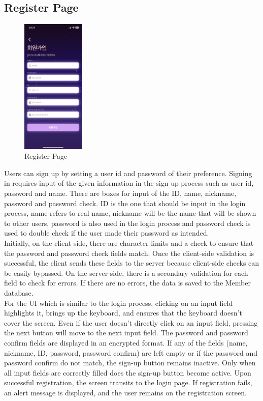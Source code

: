 \documentclass[conference]{IEEEtran}
\begin{document}
    \subsection{Register Page}
        \begin{figure}[htbp]
            \centerline{\includegraphics[width=3cm]{Images/screen/signup/SIGNUP_EMPTY.PNG}}
            \caption{Register Page}
            \label{fig}
        \end{figure}
        Users can sign up by setting a user id and password of their preference. Signing in requires input  of the given information in the sign up process such as user id, password and name. There are boxes for input of the ID, name, nickname, password and password check. ID is the one that should be input in the login process, name refers to real name, nickname will be the name that will be shown to other users, password is also used in the login process and password check is used to double check if the user made their password as intended.\\
        Initially, on the client side, there are character limits and a check to ensure that the password and password check fields match. Once the client-side validation is successful, the client sends these fields to the server because client-side checks can be easily bypassed. On the server side, there is a secondary validation for each field to check for errors. If there are no errors, the data is saved to the Member database.  \\
        For the UI which is similar to the login process, clicking on an input field highlights it, brings up the keyboard, and ensures that the keyboard doesn't cover the screen. Even if the user doesn't directly click on an input field, pressing the next button will move to the next input field. The password and password confirm fields are displayed in an encrypted format. If any of the fields (name, nickname, ID, password, password confirm) are left empty or if the password and password confirm do not match, the sign-up button remains inactive. Only when all input fields are correctly filled does the sign-up button become active. Upon successful registration, the screen transits to the login page. If registration fails, an alert message is displayed, and the user remains on the registration screen.
\end{document}
